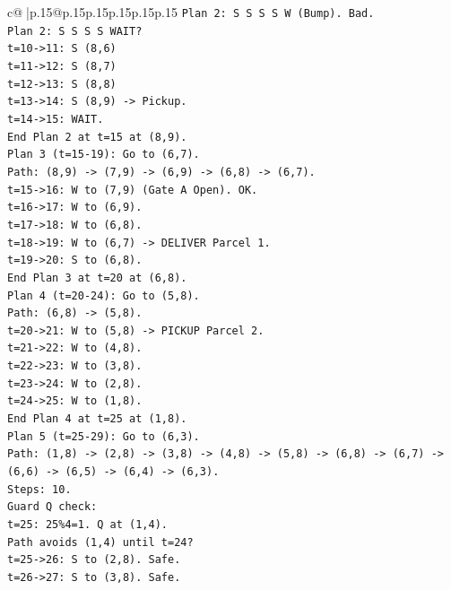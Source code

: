 \documentclass{article}
\begin{document}
{\begin{supertabular}{c@{$\;$}|p{.15\linewidth}@{}p{.15\linewidth}p{.15\linewidth}p{.15\linewidth}p{.15\linewidth}p{.15\linewidth}}
{{{\texttt{Plan 2: S S S S W (Bump). Bad.} \\
\texttt{Plan 2: S S S S WAIT?} \\
\texttt{t=10{-}>11: S (8,6)} \\
\texttt{t=11{-}>12: S (8,7)} \\
\texttt{t=12{-}>13: S (8,8)} \\
\texttt{t=13{-}>14: S (8,9) {-}> Pickup.} \\
\texttt{t=14{-}>15: WAIT.} \\
\texttt{End Plan 2 at t=15 at (8,9).} \\
\texttt{Plan 3 (t=15{-}19): Go to (6,7).} \\
\texttt{Path: (8,9) {-}> (7,9) {-}> (6,9) {-}> (6,8) {-}> (6,7).} \\
\texttt{t=15{-}>16: W to (7,9) (Gate A Open). OK.} \\
\texttt{t=16{-}>17: W to (6,9).} \\
\texttt{t=17{-}>18: W to (6,8).} \\
\texttt{t=18{-}>19: W to (6,7) {-}> DELIVER Parcel 1.} \\
\texttt{t=19{-}>20: S to (6,8).} \\
\texttt{End Plan 3 at t=20 at (6,8).} \\
\texttt{Plan 4 (t=20{-}24): Go to (5,8).} \\
\texttt{Path: (6,8) {-}> (5,8).} \\
\texttt{t=20{-}>21: W to (5,8) {-}> PICKUP Parcel 2.} \\
\texttt{t=21{-}>22: W to (4,8).} \\
\texttt{t=22{-}>23: W to (3,8).} \\
\texttt{t=23{-}>24: W to (2,8).} \\
\texttt{t=24{-}>25: W to (1,8).} \\
\texttt{End Plan 4 at t=25 at (1,8).} \\
\texttt{Plan 5 (t=25{-}29): Go to (6,3).} \\
\texttt{Path: (1,8) {-}> (2,8) {-}> (3,8) {-}> (4,8) {-}> (5,8) {-}> (6,8) {-}> (6,7) {-}> (6,6) {-}> (6,5) {-}> (6,4) {-}> (6,3).} \\
\texttt{Steps: 10.} \\
\texttt{Guard Q check:} \\
\texttt{t=25: 25\%4=1. Q at (1,4).} \\
\texttt{Path avoids (1,4) until t=24?} \\
\texttt{t=25{-}>26: S to (2,8). Safe.} \\
\texttt{t=26{-}>27: S to (3,8). Safe.} \\
}}}
\end{supertabular}}
\end{document}
